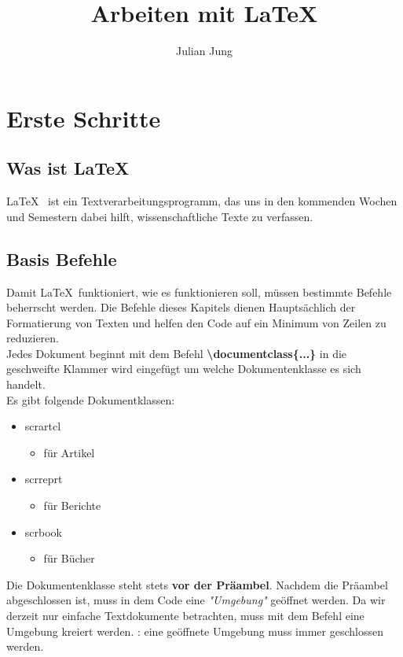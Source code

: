 \documentclass[titlepage=firstiscover]{scrartcl}
\begin{document}
\title{Arbeiten mit \LaTeX}
\author{Julian Jung}
\maketitle
\tableofcontents
\newpage
\section{Erste Schritte}
\subsection{Was ist \LaTeX}
\LaTeX ~ ist ein Textverarbeitungsprogramm, das uns in den kommenden
Wochen und Semestern dabei hilft, wissenschaftliche Texte zu verfassen.
\subsection{Basis Befehle}
Damit \LaTeX ~funktioniert, wie es funktionieren soll, müssen bestimmte Befehle
beherrscht werden. Die Befehle dieses Kapitels dienen Hauptsächlich der Formatierung
von Texten und helfen den Code auf ein Minimum von Zeilen zu reduzieren. \\
Jedes Dokument beginnt mit dem Befehl \textbf{\textbackslash documentclass\{...\}}
in die geschweifte Klammer wird eingefügt um welche Dokumentenklasse es sich
handelt. \\
Es gibt folgende Dokumentklassen:
\begin{itemize}
  \item {scrartcl}
  \begin{itemize}
    \item für Artikel
  \end{itemize}
  \item {scrreprt}
  \begin{itemize}
    \item für Berichte
  \end{itemize}
  \item {scrbook}
  \begin{itemize}
    \item für Bücher
  \end{itemize}
\end{itemize}
Die Dokumentenklasse steht stets \textbf{vor der Präambel}. Nachdem die Präambel
abgeschlossen ist, muss in dem Code eine \textit{"Umgebung"} geöffnet werden.
Da wir derzeit nur einfache Textdokumente betrachten, muss mit dem Befehl
eine Umgebung kreiert werden.
: eine geöffnete Umgebung muss immer geschlossen werden.
\end{document}
